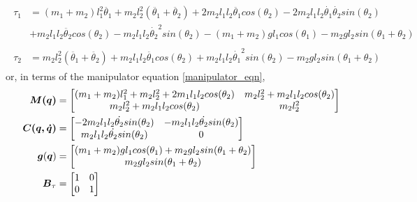 \begin{subequations}
\begin{align}
\begin{split}
	\tau_{1} &= (m_{1} + m_{2})l_{1}^{2}\ddot{\theta_{1}} +
	m_{2}l_{2}^{2}(\ddot{\theta_{1}} + \ddot{\theta_{2}})
	+ 2m_{2}l_{1}l_{2}\ddot{\theta_{1}}cos(\theta_{2})
	- 2m_{2}l_{1}l_{2}\dot{\theta_{1}}\dot{\theta_{2}}sin(\theta_{2})\\
	&+ m_{2}l_{1}l_{2}\ddot{\theta_{2}}cos(\theta_{2})
	- m_{2}l_{1}l_{2}\dot{\theta_{2}}^{2}sin(\theta_{2})
	- (m_{1} + m_{2})gl_{1}cos(\theta_{1}) - m_{2}gl_{2}sin(\theta_{1} + \theta_{2})
\end{split}
	\\
\begin{split}
	\tau_{2} &= m_{2}l_{2}^{2}(\ddot{\theta_{1}} + \ddot{\theta_{2}})
	+ m_{2}l_{1}l_{2}\ddot{\theta_{1}}cos(\theta_{2})
	+ m_{2}l_{1}l_{2}\dot{\theta_{1}}^{2}sin(\theta_{2})
	- m_{2}gl_{2}sin(\theta_{1} + \theta_{2})
\end{split}
\end{align}
\end{subequations}
or, in terms of the manipulator equation \eqref{manipulator_eqn},
\begin{subequations}
\begin{align}
	\vb*{M(q)} &= \begin{bmatrix}
		(m_{1} + m_{2})l_{1}^{2} + m_{2}l_{2}^{2} + 2m_{1}l_{1}l_{2}cos(\theta_{2}) &
		m_{2}l_{2}^{2} + m_{2}l_{1}l_{2}cos(\theta_{2})\\
		m_{2}l_{2}^{2} + m_{2}l_{1}l_{2}cos(\theta_{2}) & m_{2}l_{2}^{2}
	\end{bmatrix}\\
	\vb*{C(q, \dot{q})} &= \begin{bmatrix}
		-2m_{2}l_{1}l_{2}\dot{\theta_{2}}sin(\theta_{2}) & -m_{2}l_{1}l_{2}\dot{\theta_{2}}sin(\theta_{2})\\
		m_{2}l_{1}l_{2}\dot{\theta_{2}}sin(\theta_{2}) & 0\\
	\end{bmatrix}\\
	\vb*{g}(\vb*{q}) &= \begin{bmatrix}
		(m_{1} + m_{2})gl_{1}cos(\theta_{1}) + m_{2}gl_{2}sin(\theta_{1} + \theta_{2})\\
		m_{2}gl_{2}sin(\theta_{1} + \theta_{2})\\
	\end{bmatrix}\\
	\vb*{B}_{\tau} &= \begin{bmatrix} 1 & 0 \\ 0 & 1 \end{bmatrix}
\end{align}
\end{subequations}